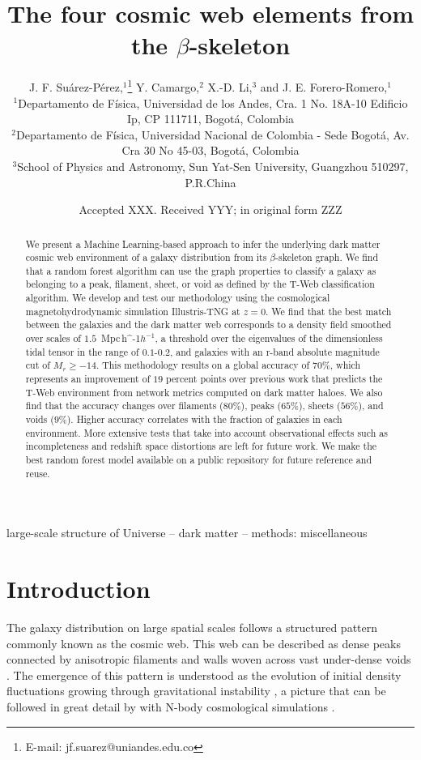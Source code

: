 \documentclass[usenatbib]{mnras}
\title[Cosmic web elements from the $\beta$-skeleton]{The four cosmic web
  elements from the $\beta$-skeleton}
\author[J. F. Su\'arez-P\'erez et al.]{
J. F. Su\'arez-P\'erez,$^{1}$\thanks{E-mail: jf.suarez@uniandes.edu.co}
Y. Camargo,$^{2}$ 
X.-D. Li,$^{3}$
and J. E. Forero-Romero,$^{1}$
\\
$^{1}$Departamento de F\'isica, Universidad de los Andes, Cra. 1
No. 18A-10 Edificio Ip, CP 111711, Bogot\'a, Colombia\\ 
$^{2}$Departamento de F\'isica, Universidad Nacional de Colombia -
Sede Bogot\'a, Av. Cra 30 No 45-03, Bogot\'a, Colombia\\ 
$^{3}$School of Physics and Astronomy, Sun Yat-Sen University,
Guangzhou 510297, P.R.China\\ 
}
\date{Accepted XXX. Received YYY; in original form ZZZ}
\newcommand{\Mpch}{\,{\rm Mpc}\,\ifmmode h^{-1}\else $h^{-1}$\fi}
\begin{document}
\label{firstpage}
\pagerange{\pageref{firstpage}--\pageref{lastpage}}
\maketitle

\begin{abstract}
We present a Machine Learning-based approach to infer the underlying dark matter cosmic web environment of a galaxy distribution from its $\beta$-skeleton graph.
We find that a random forest algorithm can use the graph properties to classify a galaxy as belonging to a peak, filament, sheet, or void as defined by the T-Web classification algorithm.
We develop and test our methodology using the cosmological magnetohydrodynamic simulation Illustris-TNG at $z=0$.
We find that the best match between the galaxies and the dark matter web corresponds to a density field smoothed over scales of $1.5$ \Mpch, a threshold over the eigenvalues of the dimensionless tidal tensor in the range of $0.1$-$0.2$, and galaxies with an r-band absolute magnitude cut of $M_r\geq-14$.
This methodology results on a global accuracy of $70\%$, which represents an improvement of $19$ percent points over previous work that predicts the T-Web environment from network metrics computed on dark matter haloes.
We also find that the accuracy changes over filaments ($80\%$), peaks ($65\%$), sheets ($56\%$), and voids ($9\%$).
Higher accuracy correlates with the fraction of galaxies in each environment.
More extensive tests that take into account observational effects such as incompleteness and redshift space distortions are left for future work.
We make the best random forest model available on a public repository for future reference and reuse.
\end{abstract}

\begin{keywords}
large-scale structure of Universe -- dark matter -- methods: miscellaneous
\end{keywords}


\section{Introduction}
The galaxy distribution on large spatial scales follows a structured 
pattern commonly known as the cosmic web. 
This web can be described as dense peaks connected by anisotropic
filaments and walls woven across vast under-dense voids 
\citep{Bond1996}.  
The emergence of this pattern is understood as the evolution of
initial density fluctuations growing through gravitational instability
\citep{ZelDovich1970,White1987}, a picture that can be followed in
great detail by with N-body cosmological simulations
\citep{Schmalzing1999,Vogelsberger2014}.     
\end{document}
